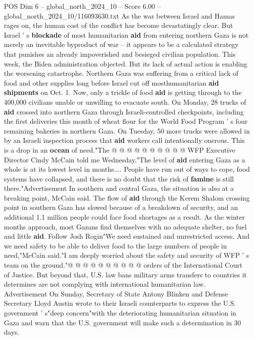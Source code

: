 \begin{textsample}{POS Dim 6 – global\_north\_2024\_10 – Score 6.00 – global\_north\_2024\_10/116093630.txt}  \label{ex:f6_pos_391}
As the war between Israel and Hamas rages on, the human cost of the conflict has become devastatingly clear.
But Israel ' s \textbf{blockade} of most humanitarian \textbf{aid} from entering northern Gaza is not merely an inevitable byproduct of war -- it appears to be a calculated strategy that punishes an already impoverished and besieged civilian population.
This week, the Biden administration objected.
But its lack of actual action is enabling the worsening catastrophe.
Northern Gaza was suffering from a critical lack of food and other supplies long before Israel cut off mosthumanitarian \textbf{aid} \textbf{shipments} on Oct. 1.
Now, only a trickle of food \textbf{aid} is getting through to the 400,000 civilians unable or unwilling to evacuate south.
On Monday, 28 trucks of \textbf{aid} crossed into northern Gaza through Israeli-controlled checkpoints, including the first deliveries this month of wheat flour for the World Food Program ' s four remaining bakeries in northern Gaza.
On Tuesday, 50 more trucks were allowed in by an Israeli inspection process that \textbf{aid} workers call intentionally onerous.
This is a drop in an \textbf{ocean} of need."The @ @ @ @ @ @ @ @ @ @ WFP Executive Director Cindy McCain told me Wednesday."The level of \textbf{aid} entering Gaza as a whole is at its lowest level in months....
People have run out of ways to cope, food systems have collapsed, and there is no doubt that the risk of \textbf{famine} is still there."Advertisement In southern and central Gaza, the situation is also at a breaking point, McCain said.
The flow of \textbf{aid} through the Kerem Shalom crossing point in southern Gaza has slowed because of a breakdown of security, and an additional 1.1 million people could face food shortages as a result.
As the winter months approach, most Gazans find themselves with no adequate shelter, no fuel and little \textbf{aid}.
Follow Josh Rogin"We need sustained and unrestricted access.
And we need safety to be able to deliver food to the large numbers of people in need,"McCain said."I am deeply worried about the safety and security of WFP ' s team on the ground."@ @ @ @ @ @ @ @ @ @ orders of the International Court of Justice.
But beyond that, U.S. law bans military arms transfers to countries it determines are not complying with international humanitarian law.
Advertisement On Sunday, Secretary of State Antony Blinken and Defense Secretary Lloyd Austin wrote to their Israeli counterparts to express the U.S. government ' s"deep concern"with the deteriorating humanitarian situation in Gaza and warn that the U.S. government will make such a determination in 30 days.

\end{textsample}
